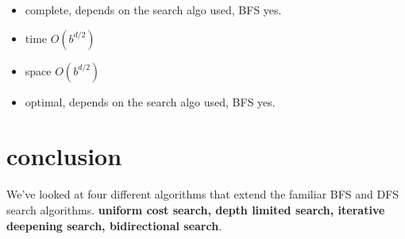 \documentclass{article}
\begin{document}
\begin{itemize}
	\item complete, depends on the search algo used, BFS yes.
	\item time $O(b^{d/2})$
	\item space $O(b^{d/2})$
	\item optimal, depends on the search algo used, BFS yes.
\end{itemize}

\section{conclusion}
We've looked at four different algorithms that extend the familiar BFS and DFS search algorithms. \textbf{uniform cost search, depth limited search, iterative deepening search, bidirectional search}.
\end{document}
